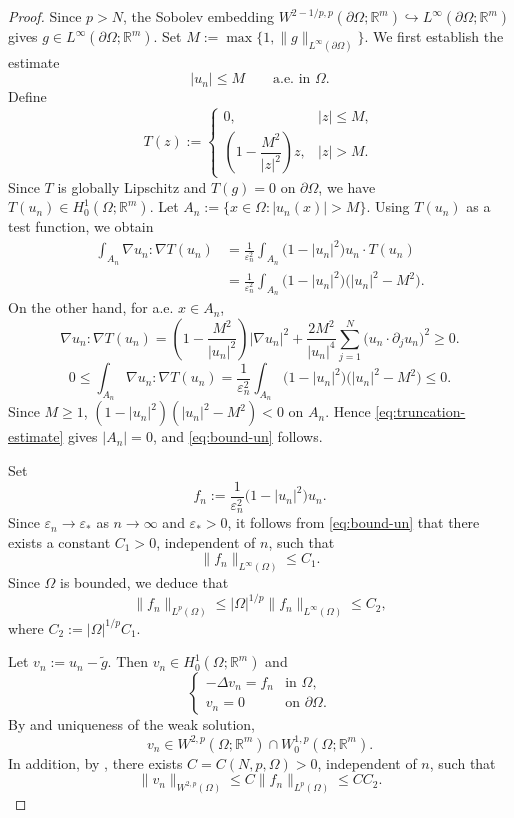 \documentclass[11pt]{amsart}
\theoremstyle{definition}
\theoremstyle{plain}
\newcommand{\abs}[1]{\lvert#1\rvert}
\newcommand{\norm}[1]{\lVert#1\rVert}
\newcommand{\R}{\mathbb{R}}
\numberwithin{equation}{section}
\begin{document}
\begin{proof}
	Since $p>N$, the Sobolev embedding
	$W^{2-1/p,p}(\partial\Omega;\R^m)
	\hookrightarrow L^\infty(\partial\Omega;\R^m)$ gives
	$g\in L^\infty(\partial\Omega;\R^m)$. Set
	$M:=\max\{1,\norm{g}_{L^\infty(\partial\Omega)}\}$. We first establish the estimate
	\begin{equation}\label{eq:bound-un}
		\abs{u_n}\leq M
		\qquad\text{a.e. in }\Omega.
	\end{equation}
	Define
	\[
	T(z):=
	\begin{cases}
		0, & \abs{z}\leq M,\\[1mm]
		\left(1-\dfrac{M^2}{\abs{z}^2}\right)z,
		& \abs{z}>M.
	\end{cases}
	\]
	Since $T$ is globally Lipschitz and $T(g)=0$ on
	$\partial\Omega$, we have $T(u_n)\in H_0^1(\Omega;\R^m)$.
	Let $A_n:=\{x\in\Omega:\abs{u_n(x)}>M\}$. Using $T(u_n)$
	as a test function, we obtain
	\begin{align*}
		\int_{A_n}
		\nabla u_n:\nabla T(u_n)
		&=
		\frac{1}{\varepsilon_n^2}
		\int_{A_n}
		\bigl(1-\abs{u_n}^2\bigr)u_n\cdot T(u_n)\\
		&=
		\frac{1}{\varepsilon_n^2}
		\int_{A_n}
		\bigl(1-\abs{u_n}^2\bigr)
		\bigl(\abs{u_n}^2-M^2\bigr).
	\end{align*}
	On the other hand, for a.e. $x\in A_n$,
\[
\nabla u_n:\nabla T(u_n)
=
\left(1-\frac{M^2}{\abs{u_n}^2}\right)\abs{\nabla u_n}^2
+
\frac{2M^2}{\abs{u_n}^4}
\sum_{j=1}^N
\bigl(u_n\cdot\partial_j u_n\bigr)^2
\geq0.
\]
\begin{equation}\label{eq:truncation-estimate}
	0
	\leq
	\int_{A_n}
	\nabla u_n:\nabla T(u_n)
	=
	\frac{1}{\varepsilon_n^2}
	\int_{A_n}
	\bigl(1-\abs{u_n}^2\bigr)
	\bigl(\abs{u_n}^2-M^2\bigr)
	\leq0.
\end{equation}
	Since $M\geq1$,
	$(1-\abs{u_n}^2)(\abs{u_n}^2-M^2)<0$ on $A_n$.
	Hence \eqref{eq:truncation-estimate} gives $\abs{A_n}=0$, and
	\eqref{eq:bound-un} follows.
	
	Set
	\[
	f_n:=
	\frac{1}{\varepsilon_n^2}
	\bigl(1-\abs{u_n}^2\bigr)u_n.
	\]
	Since $\varepsilon_n\to\varepsilon_*$ as $n\to\infty$ and
	$\varepsilon_*>0$, it follows from \eqref{eq:bound-un} that
	there exists a constant $C_1>0$, independent of $n$, such that
	\[
	\norm{f_n}_{L^\infty(\Omega)}\leq C_1.
	\]
	Since $\Omega$ is bounded, we deduce that
	\[
	\norm{f_n}_{L^p(\Omega)}
	\leq
	\abs{\Omega}^{1/p}\norm{f_n}_{L^\infty(\Omega)}
	\leq C_2,
	\]
	where $C_2:=\abs{\Omega}^{1/p}C_1$.
	
	Let $v_n:=u_n-\widetilde g$.
	Then $v_n\in H_0^1(\Omega;\R^m)$ and
	\[
	\begin{cases}
		-\Delta v_n=f_n & \text{in }\Omega,\\
		v_n=0 & \text{on }\partial\Omega.
	\end{cases}
	\]
	By \cite[Theorem~9.15]{GilbargTrudinger2001} and uniqueness of the
	weak solution,
	\[
	v_n\in W^{2,p}(\Omega;\R^m)\cap
	W_0^{1,p}(\Omega;\R^m).
	\]
	In addition, by \cite[Lemma~9.17]{GilbargTrudinger2001}, there exists
	$C=C(N,p,\Omega)>0$, independent of $n$, such that
	\[
	\norm{v_n}_{W^{2,p}(\Omega)}
	\leq
	C\norm{f_n}_{L^p(\Omega)}
	\leq
	CC_2.
	\]
	

\end{proof}
\end{document}
